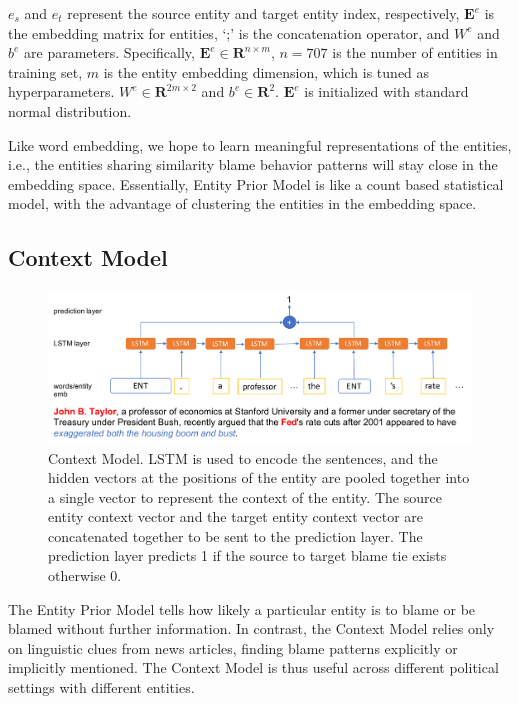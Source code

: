 \documentclass[letterpaper]{article} %
\begin{document}
$e_s$ and $e_t$ represent the source entity and target entity index, respectively, $\mathbf{E}^e$ is the embedding matrix for entities, `;' is the concatenation operator, and $W^e$ and $b^e$ are parameters. Specifically, $\mathbf{E}^e \in \mathbf{R}^{n\times m}$, $n=707$ is the number of entities in training set, $m$ is the entity embedding dimension, which is tuned as hyperparameters. $W^e \in \mathbf{R}^{2m\times 2}$ and $b^e \in \mathbf{R}^{2} $. $\mathbf{E}^e$ is initialized with standard normal distribution.

Like word embedding, we hope to learn meaningful representations of the entities, i.e., the entities sharing similarity blame behavior patterns will stay close in the embedding space. Essentially, Entity Prior Model is like a count based statistical model, with the advantage of clustering the entities in the embedding space.

\subsection{Context Model}
\label{contextmodel}

\begin{figure}[!tp] 
  \centering 
  \includegraphics[width=5.5in]{contextmodel.pdf}
  \caption{Context Model. LSTM is used to encode the sentences, and the hidden vectors at the positions of the entity are pooled together into a single vector to represent the context of the entity. The source entity context vector and the target entity context vector are concatenated together to be sent to the prediction layer. The prediction layer predicts 1 if the source to target blame tie exists otherwise 0.}
  \label{figure:contextmodel}
\end{figure}

The Entity Prior Model tells how likely a particular entity is to blame or be blamed without further information. In contrast, the Context Model relies only on linguistic clues from news articles, finding blame patterns explicitly or implicitly mentioned. The Context Model is thus useful across different political settings with different entities.
\end{document}
